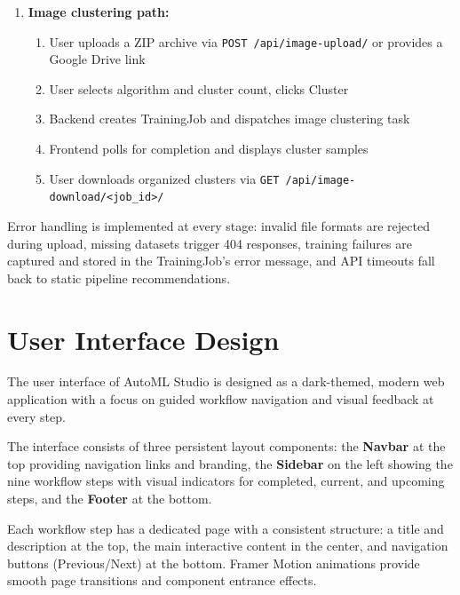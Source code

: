\documentclass[12pt,a4paper]{report}
\begin{document}
\begin{enumerate}
\begin{enumerate}
        \item User views final metrics on the Results page
        \item User exports model via \texttt{GET /api/export/<job\_id>/pkl/} or \texttt{/py/}
    \end{enumerate}
    \item \textbf{Image clustering path:}
    \begin{enumerate}
        \item User uploads a ZIP archive via \texttt{POST /api/image-upload/} or provides a Google Drive link
        \item User selects algorithm and cluster count, clicks Cluster
        \item Backend creates TrainingJob and dispatches image clustering task
        \item Frontend polls for completion and displays cluster samples
        \item User downloads organized clusters via \texttt{GET /api/image-download/<job\_id>/}
    \end{enumerate}
\end{enumerate}

Error handling is implemented at every stage: invalid file formats are rejected during upload, missing datasets trigger 404 responses, training failures are captured and stored in the TrainingJob's error message, and API timeouts fall back to static pipeline recommendations.

\section{User Interface Design}

The user interface of AutoML Studio is designed as a dark-themed, modern web application with a focus on guided workflow navigation and visual feedback at every step.

The interface consists of three persistent layout components: the \textbf{Navbar} at the top providing navigation links and branding, the \textbf{Sidebar} on the left showing the nine workflow steps with visual indicators for completed, current, and upcoming steps, and the \textbf{Footer} at the bottom.

Each workflow step has a dedicated page with a consistent structure: a title and description at the top, the main interactive content in the center, and navigation buttons (Previous/Next) at the bottom. Framer Motion animations provide smooth page transitions and component entrance effects.
\end{document}
